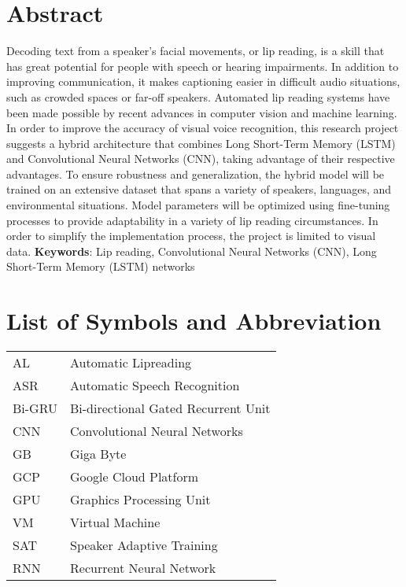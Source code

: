 			\chapter*{Abstract}
		\normalsize
			Decoding text from a speaker's facial movements, or lip reading, is a skill that has great potential for people with speech or hearing impairments. In addition to improving communication, it makes captioning easier in difficult audio situations, such as crowded spaces or far-off speakers. Automated lip reading systems have been made possible by recent advances in computer vision and machine learning. In order to improve the accuracy of visual voice recognition, this research project suggests a hybrid architecture that combines Long Short-Term Memory (LSTM) and Convolutional Neural Networks (CNN), taking advantage of their respective advantages. To ensure robustness and generalization, the hybrid model will be trained on an extensive dataset that spans a variety of speakers, languages, and environmental situations. Model parameters will be optimized using fine-tuning processes to provide adaptability in a variety of lip reading circumstances. In order to simplify the implementation process, the project is limited to visual data.
            \break	\break
            \textbf{Keywords}: Lip reading, Convolutional Neural Networks (CNN),
            Long Short-Term Memory (LSTM) networks

		\break


		\tableofcontents
		
		\listoftables
		\break
		\pagebreak

		\listoffigures
		\break
	
	
	
		\Large
			\begingroup
				\let\clearpage\relax
				\chapter*{List of Symbols and Abbreviation}
			\endgroup
		\normalsize

            \begin{tabular}{p{2cm} p{10cm}}
                AL & Automatic Lipreading \\
                ASR & Automatic Speech Recognition \\
                Bi-GRU & Bi-directional Gated Recurrent Unit \\
                CNN & Convolutional Neural Networks \\
                GB & Giga Byte\\
                GCP & Google Cloud Platform\\
                GPU & Graphics Processing Unit\\
                VM & Virtual Machine\\
                SAT & Speaker Adaptive Training \\
                RNN & Recurrent Neural Network \\
            \end{tabular}
		\break
		\pagebreak
		
	